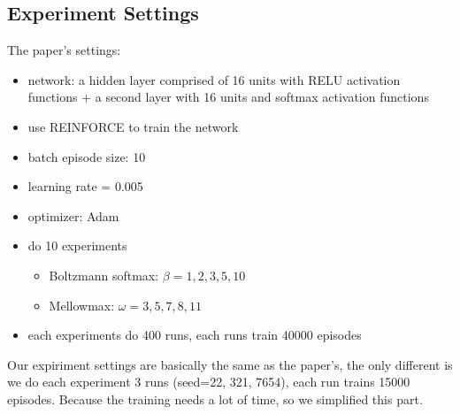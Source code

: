 \subsection*{Experiment Settings}
The paper's settings:
\begin{itemize}
    \item network: a hidden layer comprised of 16 units with RELU activation functions + a second layer with 16 units and softmax activation functions
    \item use REINFORCE to train the network
    \item batch episode size: 10
    \item learning rate = 0.005
    \item optimizer: Adam
    \item do 10 experiments
    \begin{itemize}
        \item Boltzmann softmax: $\beta=1,2,3,5,10$
        \item Mellowmax: $\omega=3,5,7,8,11$
    \end{itemize}
    \item each experiments do 400 runs, each runs train 40000 episodes
\end{itemize}
Our expiriment settings are basically the same as the paper's, the only different is we do each experiment 3 runs (seed=22, 321, 7654), each run trains 15000 episodes.
Because the training needs a lot of time, so we simplified this part.
